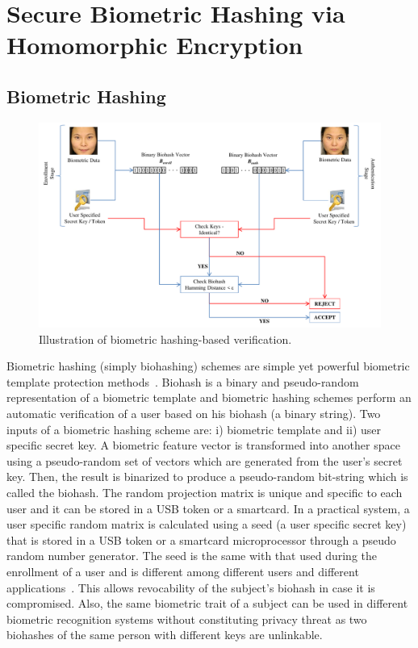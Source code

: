\documentclass[conference]{IEEEtran}
\begin{document}
\section{Secure Biometric Hashing via Homomorphic Encryption}

\subsection{Biometric Hashing}

\begin{figure}[h!]
\begin{center}
\includegraphics[width=0.7\linewidth]{figures/FIG1}
\caption{Illustration of biometric hashing-based verification.}
\label{fig2}
\end{center}
\end{figure}

Biometric hashing (simply biohashing) schemes are simple yet
powerful biometric template protection methods~\cite{teoh2006, Bai, Karabat, Lumini, Rathgeb,Kuan}. Biohash is a binary and pseudo-random
representation of a biometric template and biometric hashing schemes
perform an automatic verification of a user based on his biohash (a
binary string). Two inputs of a biometric hashing scheme are: i)
biometric template and ii) user specific secret key. A biometric
feature vector is transformed into another space using a
pseudo-random set of vectors which are generated from the user's
secret key. Then, the result is binarized to produce a pseudo-random
bit-string which is called the biohash. The random projection matrix
is unique and specific to each user and it can be stored in a USB
token or a smartcard. In a practical system, a user specific random
matrix is calculated using a seed (a user specific secret key) that
is stored in a USB token or a smartcard microprocessor through a
pseudo random number generator. The seed is the same with that used
during the enrollment of a user and is different among different
users and different applications~\cite{teoh2006}. This allows
revocability of the subject's biohash in case it is compromised.
Also, the same biometric trait of a subject can be used in different
biometric recognition systems without constituting privacy threat as
two biohashes of the same person with different keys are unlinkable.
\end{document}
